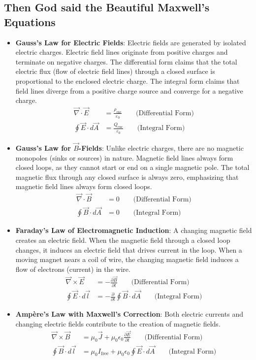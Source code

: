 \documentclass[12pt,b4paper]{article}
\begin{document}
\subsection{Then God said the Beautiful Maxwell's Equations}
\begin{itemize}
\setlength{\itemsep}{0pt}
    \item \textbf{Gauss's Law for Electric Fields}: Electric fields are generated by isolated electric charges. Electric field lines originate from positive charges and terminate on negative charges. The differential form claims that the total electric flux (flow of electric field lines) through a closed surface is proportional to the enclosed electric charge. The integral form claims that field lines diverge from a positive charge source and converge for a negative charge.
    \begin{align}
        \vec{\nabla}\cdot\vec{E}&=\frac{\rho_\text{enc}}{\varepsilon_0}\qquad\text{(Differential Form)}\\
        \oint\vec{E}\cdot d\vec{A}&=\frac{Q_\text{enc}}{\varepsilon_0}\qquad\text{(Integral Form)}
    \end{align}
    \item \textbf{Gauss's Law for $\vec{B}$-Fields}: Unlike electric charges, there are no magnetic monopoles (sinks or sources) in nature. Magnetic field lines always form closed loops, as they cannot start or end on a single magnetic pole. The total magnetic flux through any closed surface is always zero, emphasizing that magnetic field lines always form closed loops.
    \begin{align}
        \vec{\nabla}\cdot\vec{B}&=0\qquad\text{(Differential Form)}\\
        \oint\vec{B}\cdot d\vec{A}&=0\qquad\text{(Integral Form)}
    \end{align}
    \item \textbf{Faraday's Law of Electromagnetic Induction}: A changing magnetic field creates an electric field. When the magnetic field through a closed loop changes, it induces an electric field that drives current in the loop. When a moving magnet nears a coil of wire, the changing magnetic field induces a flow of electrons (current) in the wire.
    \begin{align}
        \vec{\nabla}\times\vec{E}&=-\frac{\partial \vec{B}}{\partial t}\qquad\text{(Differential Form)}\label{eq:ampere-maxwell-law}\\
        \oint\vec{E}\cdot d\vec{l}&=-\frac{\partial}{\partial t}\oint\vec{B}\cdot d\vec{A}\qquad\text{(Integral Form)}
    \end{align}
    \item \textbf{Ampère's Law with Maxwell's Correction}: Both electric currents and changing electric fields contribute to the creation of magnetic fields.
    \begin{align}
         \vec{\nabla}\times\vec{B}&=\mu_0\vec{J}+\mu_0\epsilon_0\frac{\partial \vec{E}}{\partial t}\qquad\text{(Differential Form)}\\
         \oint\vec{B}\cdot d\vec{l}&=\mu_0I_\text{free}+\mu_0\epsilon_0\oint\vec{E}\cdot d\vec{A}\qquad\text{(Integral Form)}
    \end{align}
\end{itemize}
\end{document}

